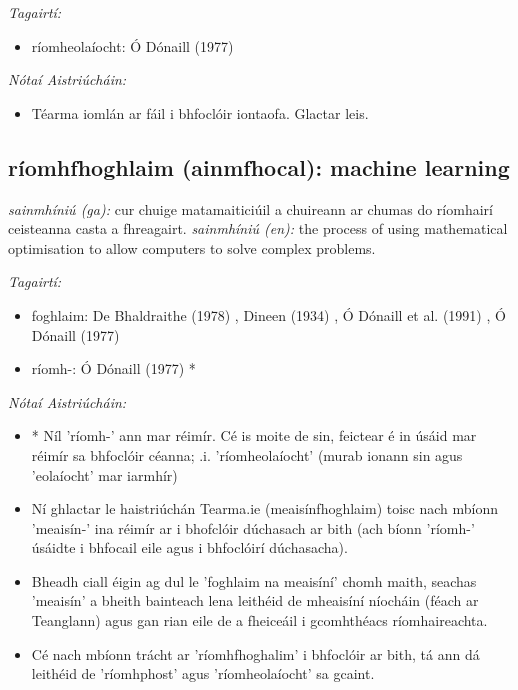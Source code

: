 \documentclass{article}
\begin{document}
 \noindent \textit{Tagairtí:}
\begin{itemize}
	\item ríomheolaíocht: Ó Dónaill (1977) \cite{odonaill}
\end{itemize}

 \noindent \textit{Nótaí Aistriúcháin:}
\begin{itemize}
	\item Téarma iomlán ar fáil i bhfoclóir iontaofa. Glactar leis.
\end{itemize}


\subsection*{ríomhfhoghlaim (ainmfhocal): machine learning} 
 \noindent \textit{sainmhíniú (ga):} cur chuige matamaiticiúil a chuireann ar chumas do ríomhairí ceisteanna casta a fhreagairt.
\newline\newline
 \noindent \textit{sainmhíniú (en):} the process of using mathematical optimisation to allow computers to solve complex problems.
\newline

 \noindent \textit{Tagairtí:}
\begin{itemize}
	\item foghlaim: De Bhaldraithe (1978) \cite{de-bhaldraithe}, Dineen (1934) \cite{dineen}, Ó Dónaill et al. (1991) \cite{focloir-beag}, Ó Dónaill (1977) \cite{odonaill}
	\item ríomh-: Ó Dónaill (1977) \cite{odonaill}*
\end{itemize}

 \noindent \textit{Nótaí Aistriúcháin:}
\begin{itemize}
	\item * Níl 'ríomh-' ann mar réimír. Cé is moite de sin, feictear é in úsáid mar réimír sa bhfoclóir céanna; .i. 'ríomheolaíocht' (murab ionann sin agus 'eolaíocht' mar iarmhír)
	\item Ní ghlactar le haistriúchán Tearma.ie (meaisínfhoghlaim) toisc nach mbíonn 'meaisín-' ina réimír ar i bhofclóir dúchasach ar bith (ach bíonn 'ríomh-' úsáidte i bhfocail eile agus i bhfoclóirí dúchasacha).
	\item Bheadh ciall éigin ag dul le 'foghlaim na meaisíní' chomh maith, seachas 'meaisín' a bheith bainteach lena leithéid de mheaisíní níocháin (féach ar Teanglann) agus gan rian eile de a fheiceáil i gcomhthéacs ríomhaireachta.
	\item Cé nach mbíonn trácht ar 'ríomhfhoghalim' i bhfoclóir ar bith, tá ann dá leithéid de 'ríomhphost' agus 'ríomheolaíocht' sa gcaint.
\end{itemize}
\end{document}

